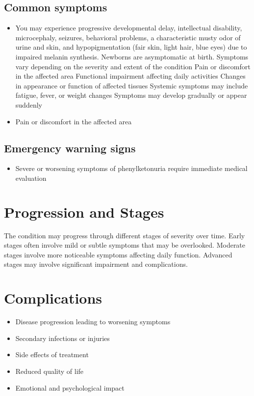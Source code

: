 \subsection{Common symptoms}
\begin{itemize}[noitemsep]
  \item You may experience progressive developmental delay, intellectual disability, microcephaly, seizures, behavioral problems, a characteristic musty odor of urine and skin, and hypopigmentation (fair skin, light hair, blue eyes) due to impaired melanin synthesis. Newborns are asymptomatic at birth. Symptoms vary depending on the severity and extent of the condition Pain or discomfort in the affected area Functional impairment affecting daily activities Changes in appearance or function of affected tissues Systemic symptoms may include fatigue, fever, or weight changes Symptoms may develop gradually or appear suddenly
  \item Pain or discomfort in the affected area
  \end{itemize}

\subsection{Emergency warning signs}
\begin{itemize}[noitemsep]
  \item Severe or worsening symptoms of phenylketonuria require immediate medical evaluation
\end{itemize}
\section{Progression and Stages}
The condition may progress through different stages of severity over time. Early stages often involve mild or subtle symptoms that may be overlooked. Moderate stages involve more noticeable symptoms affecting daily function. Advanced stages may involve significant impairment and complications.
\section{Complications}
\begin{itemize}[noitemsep]
  \item Disease progression leading to worsening symptoms
  \item Secondary infections or injuries
  \item Side effects of treatment
  \item Reduced quality of life
  \item Emotional and psychological impact
\end{itemize}
